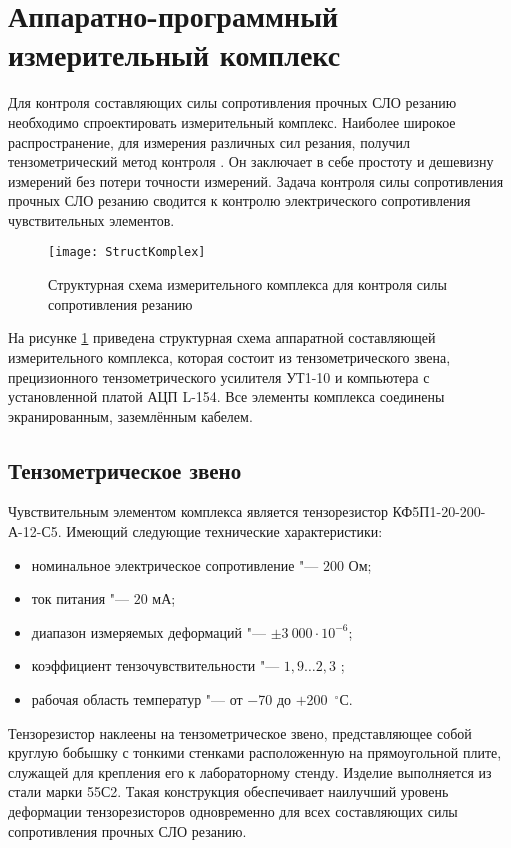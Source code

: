 \section{Аппаратно-программный измерительный комплекс}\label{sect2_4}

Для контроля составляющих силы сопротивления прочных СЛО резанию необходимо спроектировать измерительный комплекс. Наиболее широкое распространение, для измерения различных сил резания, получил тензометрический метод контроля \todo{[ссылки]}. Он заключает в себе простоту и дешевизну измерений без потери точности измерений. Задача контроля силы сопротивления прочных СЛО резанию сводится к контролю электрического сопротивления чувствительных элементов.

\begin{figure} [htbp]
	\center
	\texttt{[image: StructKomplex]}
	\caption{Структурная схема измерительного комплекса для контроля силы сопротивления резанию} 
	\label{img:StructKomplex}  
\end{figure}

На рисунке \ref{img:StructKomplex} приведена структурная схема аппаратной составляющей измерительного комплекса, которая состоит из тензометрического звена, прецизионного тензометрического усилителя УТ1-10 и компьютера с установленной платой АЦП L-154. Все элементы комплекса соединены экранированным, заземлённым кабелем.

\subsection{Тензометрическое звено}\label{subsect2_4_1}

Чувствительным элементом комплекса является тензорезистор КФ5П1-20-200-А-12-С5. Имеющий следующие технические характеристики: 
\begin{itemize}
	\item номинальное электрическое сопротивление "--- $200$ Ом;
	\item ток питания "--- $20$ мА;
	\item диапазон измеряемых деформаций "--- $\pm3~000\cdot10^{-6}$;
	\item коэффициент тензочувствительности "--- $1,9\ldots2,3$ ;
	\item рабочая область температур "--- от $-$70 до $+$200~${}^\circ$С.
\end{itemize}

Тензорезистор наклеены на тензометрическое звено, представляющее собой круглую бобышку с тонкими стенками расположенную на прямоугольной плите, служащей для крепления его к лабораторному стенду. Изделие выполняется из стали марки 55С2. Такая конструкция обеспечивает наилучший уровень деформации тензорезисторов одновременно для всех составляющих силы сопротивления прочных СЛО резанию.

